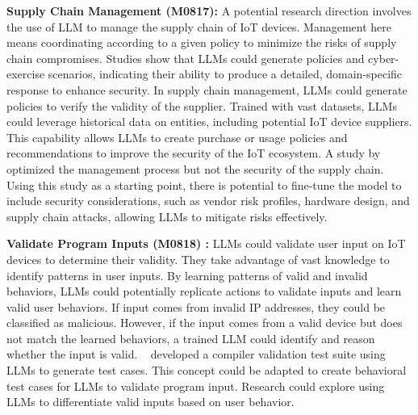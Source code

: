 \smallskip
\noindent \textbf{Supply Chain Management (M0817): } A potential research direction involves the use of LLM to manage the supply chain of IoT devices.
Management here means coordinating according to a given policy to minimize the risks of supply chain compromises.
Studies show that LLMs could generate policies and cyber-exercise scenarios, indicating their ability to produce a detailed, domain-specific response to enhance security. 
In supply chain management, LLMs could generate policies to verify the validity of the supplier. 
Trained with vast datasets, LLMs could leverage historical data on entities, including potential IoT device suppliers.
This capability allows LLMs to create purchase or usage policies and recommendations to improve the security of the IoT ecosystem.
A study by~\citet{li2023large} optimized the management process but not the security of the supply chain.
Using this study as a starting point, there is potential to fine-tune the model to include security considerations, such as vendor risk profiles, hardware design, and supply chain attacks, allowing LLMs to mitigate risks effectively.

\smallskip
\noindent \textbf{Validate Program Inputs (M0818) : } LLMs could validate user input on IoT devices to determine their validity.
They take advantage of vast knowledge to identify patterns in user inputs.
By learning patterns of valid and invalid behaviors, LLMs could potentially replicate actions to validate inputs and learn valid user behaviors.
If input comes from invalid IP addresses, they could be classified as malicious.
However, if the input comes from a valid device but does not match the learned behaviors, a trained LLM could identify and reason whether the input is valid.
~\citet{munley2024llm4vv} developed a compiler validation test suite using LLMs to generate test cases.
This concept could be adapted to create behavioral test cases for LLMs to validate program input. 
Research could explore using LLMs to differentiate valid inputs based on user behavior.